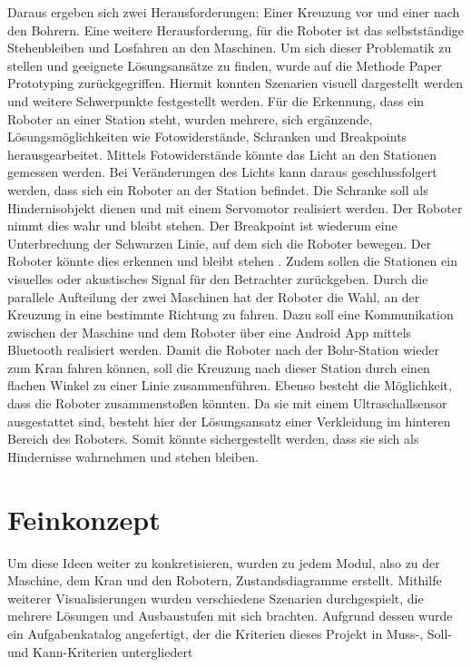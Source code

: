 Daraus ergeben sich zwei Herausforderungen: Einer Kreuzung vor und einer nach den Bohrern.
Eine weitere Herausforderung, für die Roboter ist das selbstständige Stehenbleiben und Losfahren an den Maschinen. Um sich dieser Problematik zu stellen und geeignete Lösungsansätze zu finden, wurde auf die Methode Paper Prototyping zurückgegriffen. Hiermit konnten Szenarien visuell dargestellt werden und weitere Schwerpunkte festgestellt werden. Für die Erkennung, dass ein
Roboter an einer Station steht, wurden mehrere, sich ergänzende, Lösungsmöglichkeiten wie Fotowiderstände, Schranken und Breakpoints herausgearbeitet. Mittels Fotowiderstände könnte das Licht an den Stationen gemessen werden. Bei Veränderungen des Lichts kann daraus geschlussfolgert werden, dass sich ein Roboter an der Station befindet. Die Schranke soll als Hindernisobjekt dienen und mit einem Servomotor realisiert werden. Der Roboter nimmt dies wahr und bleibt stehen.   
Der Breakpoint ist wiederum eine Unterbrechung der Schwarzen Linie, auf dem sich die Roboter bewegen. Der Roboter könnte dies erkennen und bleibt stehen .  Zudem sollen die Stationen ein visuelles oder akustisches Signal für den Betrachter zurückgeben.  Durch die parallele Aufteilung der zwei Maschinen hat der Roboter die Wahl, an der Kreuzung in eine bestimmte Richtung zu fahren. Dazu soll eine Kommunikation zwischen der Maschine und dem Roboter über eine Android App mittels Bluetooth realisiert werden. Damit die Roboter nach der Bohr-Station wieder zum Kran fahren können, soll die Kreuzung nach dieser Station durch einen flachen Winkel zu einer Linie zusammenführen. Ebenso besteht die Möglichkeit, dass die Roboter zusammenstoßen könnten. Da sie mit einem Ultraschallsensor ausgestattet sind, besteht hier der Lösungsansatz einer Verkleidung im hinteren Bereich des Roboters. Somit könnte sichergestellt werden, dass sie sich als Hindernisse
wahrnehmen und stehen bleiben.

\section{Feinkonzept}
Um diese Ideen weiter zu konkretisieren, wurden zu jedem Modul, also zu der Maschine, dem
Kran und den Robotern, Zustandsdiagramme erstellt. Mithilfe weiterer Visualisierungen wurden verschiedene Szenarien durchgespielt, die mehrere Lösungen und Ausbaustufen mit sich
brachten. Aufgrund dessen wurde ein Aufgabenkatalog angefertigt, der die Kriterien dieses
Projekt in Muss-, Soll- und Kann-Kriterien untergliedert